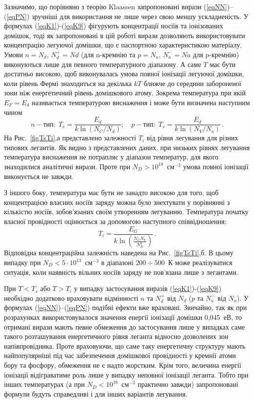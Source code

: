 \documentclass[12pt,a4paper,titlepage,oneside]{book}
\numberwithin{equation}{part}
\begin{document}
Зазначимо, що порівняно з теорію Klaassen запропоновані вирази (\ref{eqNN})--(\ref{eqPN}) зручніші для використання не лише через свою меншу ускладненість.
У формулах (\ref{eqK1})-(\ref{eqK9}) фігурують концентрації носіїв та іонізованих домішок, тоді як запропоновані в цій роботі вирази
дозволяють використовувати концентрацію легуючої домішки, що є паспортною характеристикою матеріалу.
Умови $n=N_d$, $N_d^+=Nd$ (для n-кремнію та $p=N_a$, $N_a^-=Na$ для p-кремнію) виконуються лише для певного температурного діапазону.
А саме $T$ має бути достатньо високою, щоб виконувалась умова повної іонізації легуючої домішки,
коли рівень Фермі знаходиться на декілька $kT$ ближче до середини забороненої зони
ніж енергетичний рівень домішкового атому.
Зокрема температура при якій $E_F=E_d$ називається температурою виснаження і може бути визначена наступним чином
\begin{equation}\label{eqTs}
  n-\text{тип}:\;T_s=\frac{E_d}{k\ln(N_C/N_d)};\quad p-\text{тип}:\;T_s=\frac{E_d}{k\ln(N_V/N_a)}\,.
\end{equation}
На Рис.~\ref{figTsTi},а представлено залежності $T_i$ від рівня легування для різних типових легантів.
Як видно з представлених даних, при низьких рівнях легування температура виснаження не потрапляє
у діапазон температур, для якого знаходилися аналітичні вирази.
Проте при $N_D>10^{18}$~см$^{-3}$ умова повної іонізації виконується не завжди.



З іншого боку, температура має бути не занадто високою для того, щоб концентрацією власних носіїв заряду можна було знехтувати
у порівнянні з кількістю носіїв, зобов'язаних своїм утворенням легуванню.
Температура початку власної провідності оцінюється за допомогою наступного співвідношення:
\begin{equation}\label{eqTi}
  T_i=\frac{E_G}{k \ln\left(\frac{N_C N_V}{N_D^2}\right)}\,.
\end{equation}
Відповідна концентраційна залежність наведена на Рис.~\ref{figTsTi},б.
В цьому випадку при $N_D<5\cdot 10^{13}$~см$^{-3}$ в діапазоні $200\div500$~К може реалізуватися ситуація,
коли наявність вільних носіїв заряду не пов'язана лише з легантами.



При $T<T_s$ або $T>T_i$ у випадку застосування виразів (\ref{eqK1})-(\ref{eqK9}) необхідно додатково враховувати
відмінності $n$ та $N_d^+$ від $N_d$ ($p$ та $N_a^-$ від $N_a$).
У формулах (\ref{eqNN})--(\ref{eqPN}) подібні ефекти вже враховані.
Звичайно, так як при розрахунках використовувалося значення енергії іонізації домішки 0,045~еВ, то отримані
вирази мають певне обмеження до застосування лише у випадках саме такого розташування енергетичного рівня леганта відносно дозволених зон
напівпровідника.
Проте враховуючи, що саме таку енергетичну структуру мають найпопулярніші під час забезпечення домішкової провідності у кремнії атоми бору та фосфору,
обмеження не є надто жорстким.
Крім того, величина енергії іонізації відіграватиме роль лише у випадку неповної іонізації леганта.
Тобто при інших температурах (а при $N_D<10^{18}$~см$^{-3}$ практично завжди) запропоновані формули будуть справедливі і для інших варіантів легування.
\end{document}
